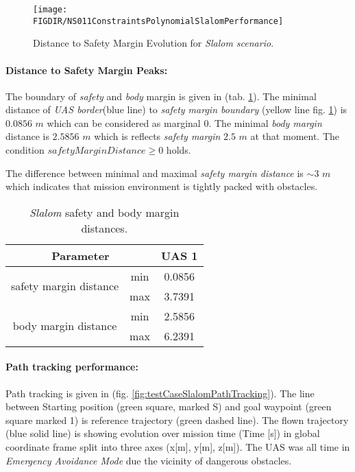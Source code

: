 \begin{figure}[H]
    \centering
    \texttt{[image: \\FIGDIR/NS011ConstraintsPolynomialSlalomPerformance]} 
    \caption{Distance to Safety Margin Evolution for \emph{Slalom scenario}.}
    \label{fig:testCaseSlalomAvoidancePerformance}
\end{figure}

\paragraph{Distance to Safety Margin Peaks:} The boundary of \emph{safety} and  \emph{body} margin is given in (tab. \ref{tab:testCaseSlalomSafetyAndBodyMarginDistances}). The minimal distance of \emph{UAS border}(blue line) to \emph{safety margin boundary} (yellow line fig. \ref{fig:testCaseSlalomAvoidancePerformance}) is $0.0856$ $m$ which can be considered as marginal $0$. The minimal \emph{body margin} distance is $2.5856$ $m$ which is reflects \emph{safety margin} $2.5$ $m$ at that moment. The condition $safety Margin Distance \ge 0$ holds.
    
    
The difference between minimal and maximal \emph{safety margin distance} is $\sim 3$ $m$ which indicates that mission environment is  tightly packed with obstacles.

\begin{table}[H]
    \centering
    \begin{tabular}{c|c||c}
    \multicolumn{2}{c||}{Parameter} & UAS 1 \\\hline\hline
    \multirow{2}{*}{safety margin distance} & min & 0.0856\\\cline{2-3}
                                            & max & 3.7391 \\\hline
    \multirow{2}{*}{body margin distance}   & min & 2.5856  \\\cline{2-3}
                                            & max & 6.2391 
    \end{tabular}
    \caption{\emph{Slalom} safety and body margin distances.}
    \label{tab:testCaseSlalomSafetyAndBodyMarginDistances}
\end{table}


\paragraph{Path tracking performance:} Path tracking is given in (fig. \ref{fig:testCaseSlalomPathTracking}). The line between Starting position (green square, marked S) and  goal waypoint (green square marked 1) is reference trajectory (green dashed line). The flown trajectory (blue solid line) is showing evolution over mission time (Time [s]) in global coordinate frame split into three axes (x[m], y[m], z[m]). The UAS was all time in \emph{Emergency Avoidance Mode} due the vicinity of dangerous obstacles. 

